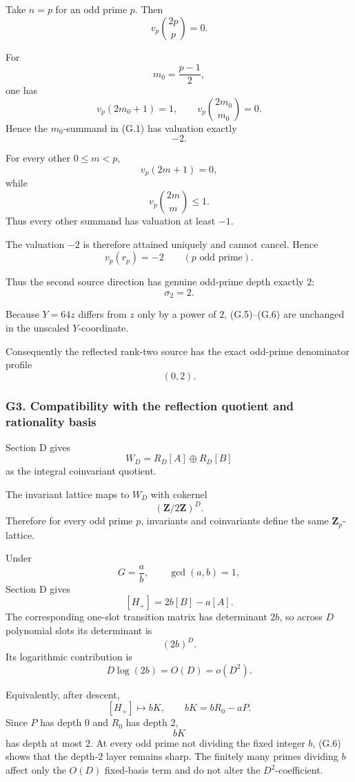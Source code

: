 \documentclass[
  10pt,
  letterpaper,
]{article}
\theoremstyle{definition}
\theoremstyle{remark}
\begin{document}
Take \(n=p\) for an odd prime \(p\). Then \[
v_p\binom{2p}{p}=0.
\]

For \[
m_0=\frac{p-1}{2},
\] one has \[
v_p(2m_0+1)=1,
\qquad
v_p\binom{2m_0}{m_0}=0.
\] Hence the \(m_0\)-summand in (G.1) has valuation exactly \[
-2.
\]

For every other \(0\le m<p\), \[
v_p(2m+1)=0,
\] while \[
v_p\binom{2m}{m}\le1.
\] Thus every other summand has valuation at least \(-1\).

The valuation \(-2\) is therefore attained uniquely and cannot cancel.
Hence \[
\boxed{
v_p(r_p)=-2
\qquad(p\text{ odd prime}).
}
\tag{G.6}
\]

Thus the second source direction has genuine odd-prime depth exactly
\(2\): \[
\boxed{\sigma_2=2.}
\]

Because \(Y=64z\) differs from \(z\) only by a power of \(2\),
(G.5)--(G.6) are unchanged in the unscaled \(Y\)-coordinate.

Consequently the reflected rank-two source has the exact odd-prime
denominator profile \[
\boxed{(0,2).}
\]

\subsubsection{G3. Compatibility with the reflection quotient and
rationality
basis}\label{g3.-compatibility-with-the-reflection-quotient-and-rationality-basis}

Section D gives \[
W_D
=
R_D[A]\oplus R_D[B]
\] as the integral coinvariant quotient.

The invariant lattice maps to \(W_D\) with cokernel \[
(\mathbf Z/2\mathbf Z)^D.
\] Therefore for every odd prime \(p\), invariants and coinvariants
define the same \(\mathbf Z_p\)-lattice.

Under \[
G=\frac ab,
\qquad
\gcd(a,b)=1,
\] Section D gives \[
[H_+]=2b[B]-a[A].
\] The corresponding one-slot transition matrix has determinant \(2b\),
so across \(D\) polynomial slots its determinant is \[
(2b)^D.
\] Its logarithmic contribution is \[
D\log(2b)=O(D)=o(D^2).
\]

Equivalently, after descent, \[
[H_+]\longmapsto bK,
\qquad
bK=bR_0-aP.
\] Since \(P\) has depth \(0\) and \(R_0\) has depth \(2\), \[
bK
\] has depth at most \(2\). At every odd prime not dividing the fixed
integer \(b\), (G.6) shows that the depth-\(2\) layer remains sharp. The
finitely many primes dividing \(b\) affect only the \(O(D)\) fixed-basis
term and do not alter the \(D^2\)-coefficient.
\end{document}
